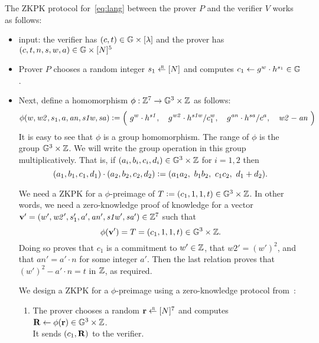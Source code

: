 \documentclass[11pt]{article}
\begin{document}
\medskip\noindent
The ZKPK protocol for~\eqref{eq:lang} 
between the prover $P$ and the verifier $V$ works as follows:
\begin{itemize}
\item input:  the verifier has $(c, t) \in \mathbb G \times [{\lambda}]$ and 
the prover has $(c, t, n, s, w, a) \in \mathbb G \times [{N}]^5$  

\item Prover $P$ chooses a random integer $s_1 \rgets \range{N}$ and computes
       $c_1 \gets g^w \cdot h^{s_1} \in \mathbb G$. 

\item Next, define a homomorphism $\phi:\mathbb Z^7 \to \mathbb G^3 \times \mathbb Z$ as follows:
\begin{equation} \label{eq:hom}
  \phi(w, \mathit{w2}, s_1, a, \mathit{an}, \mathit{s1w}, \mathit{sa}) \deq
      \Bigl(\ 
       g^w \cdot h^{\mathit{s1}},\ \ \ 
       g^{\mathit{w2}} \cdot h^{\mathit{s1w}} / c_1^w,\ \ \ 
       g^{\mathit{an}} \cdot h^{\mathit{sa}} / c^a,\ \ \ 
       \mathit{w2} - \mathit{an}\ \Bigr)
\end{equation}
It is easy to see that $\phi$ is a group homomorphism.
The range of $\phi$ is the group $\mathbb G^3 \times \mathbb Z$.  
We will write the group operation in this group multiplicatively.
That is, if $(a_i, b_i, c_i, d_i) \in \mathbb G^3 \times \mathbb Z$ for $i=1,2$
then 
\[  (a_1, b_1, c_1, d_1) \cdot (a_2, b_2, c_2, d_2) \mathrel{\mathop:}= 
      (a_1 a_2,\ b_1 b_2,\ c_1 c_2,\ d_1 + d_2).  \]

We need a ZKPK for a $\phi$-preimage of 
$T \mathrel{\mathop:}= (c_1, 1, 1, t) \in \mathbb G^3 \times \mathbb Z$. 
In other words, we need a zero-knowledge proof of knowledge for a vector 
$\mathbf{v}' = (w', \mathit{w2}', s_1', a', \mathit{an}', 
              \mathit{s1w}', \mathit{sa}') \in \mathbb Z^7$ 
such that 
\[   \phi(\mathbf{v}') = T = (c_1, 1, 1, t) \in \mathbb G^3 \times \mathbb Z.  \]
Doing so proves 
that $c_1$ is a commitment to $w' \in \mathbb Z$, 
that $\mathit{w2}' = (w')^2$, and 
that $\mathit{an}' = a' \cdot n$ for some integer $a'$.
Then the last relation proves that $(w')^2 - a' \cdot n = t$ in $\mathbb Z$,
as required. 

We design a ZKPK for a $\phi$-preimage 
using a zero-knowledge protocol from~\cite[\S 3.5]{ourpaper}:
\begin{enumerate}
\item The prover chooses a random $\rv \rgets \range{N}^7$
and computes $\mathbf{R} \gets \phi(\mathbf{r}) \in \mathbb G^3 \times \mathbb Z$. \\
It sends $(c_1, \mathbf{R})$ to the verifier.


\end{enumerate}
\end{itemize}
\end{document}
